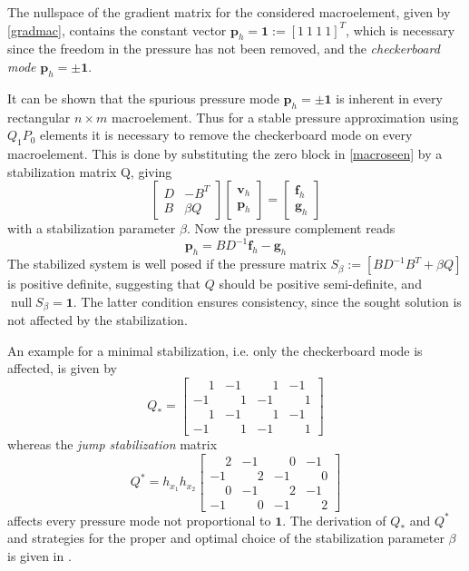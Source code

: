 \documentclass[a4paper,10pt,BCOR=15mm]{scrbook}
\DeclareMathOperator{\nulli}{null}
\begin{document}
The nullspace of the gradient matrix for the considered macroelement, given by \eqref{gradmac}, contains the constant vector $\mathbf p_h = \mathbf 1:= [1~ 1~ 1 ~1]^T$, which is necessary since the freedom in the pressure has not been removed, and the \textit{checkerboard mode} $\mathbf p_h = \pm \mathbf 1$. 

It can be shown that the spurious pressure mode $\mathbf p_h = \pm \mathbf 1 $ is inherent in every rectangular $n\times m$ macroelement. Thus for a stable pressure approximation using $Q_1P_0$ elements it is necessary to remove the checkerboard mode on every macroelement. This is done by substituting the zero block in \eqref{macroseen} by a stabilization matrix Q, giving
\begin{equation*}
 \begin{bmatrix} D & -B^T \\ B &  \beta Q \end{bmatrix} \begin{bmatrix} \mathbf v_h \\ \mathbf p_h \end{bmatrix} = \begin{bmatrix} \mathbf
f_h \\ \mathbf g_h \end{bmatrix}
\end{equation*}
with a stabilization parameter $\beta$. Now the pressure complement reads
\begin{equation*}
 [BD^{-1}B^T+\beta Q]\mathbf p_h = BD^{-1}\mathbf f_h - \mathbf g_h
\end{equation*}
The stabilized system is well posed if the pressure matrix $S_\beta := [BD^{-1}B^T+\beta Q]$ is positive definite, suggesting that $Q$ should be positive semi-definite, and $\nulli S_\beta = \mathbf 1$. The latter condition ensures consistency, since the sought solution is not affected by the stabilization.

An example for a minimal stabilization, i.e. only the checkerboard mode is affected, is given by
\begin{equation*}
 Q_* = \begin{bmatrix}\phantom{-}1 &-1 &\phantom{-}1 &-1 \\-1 &\phantom{-}1 &-1 &\phantom{-}1 \\\phantom{-}1 &-1 &\phantom{-}1 &-1 \\-1 &\phantom{-}1 &-1 &\phantom{-}1 \end{bmatrix}
\end{equation*}
whereas the \textit{jump stabilization} matrix 
\begin{equation*}
 Q^* = h_{x_1}h_{x_2}\begin{bmatrix}\phantom{-}2 &-1 &\phantom{-}0 &-1 \\-1 &\phantom{-}2 &-1 &\phantom{-}0 \\\phantom{-}0 &-1 &\phantom{-}2 &-1 \\-1 &\phantom{-}0 &-1 &\phantom{-}2 \end{bmatrix}
\end{equation*}
affects every pressure mode not proportional to $\mathbf 1$. The derivation of $Q_*$ and $Q^*$ and strategies for the proper and optimal choice of the stabilization parameter $\beta$ is given in \cite[p. 237-243]{elma}. 
\end{document}
